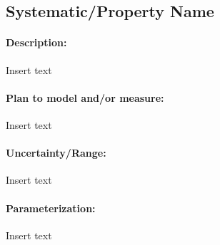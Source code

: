 \subsection{Systematic/Property Name}

\paragraph{Description:}
Insert text

\paragraph{Plan to model and/or measure:}
Insert text

\paragraph{Uncertainty/Range:}
Insert text

\paragraph{Parameterization:}
Insert text